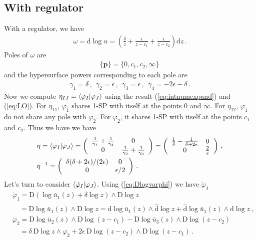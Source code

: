 \documentclass[a4paper,11pt]{article}
\newcommand{\nn}{\nonumber}
\newcommand{\nd}{\mathrm{d}}
\newcommand{\nD}{\mathrm{D}}
\newcommand{\nds}{\hat{\mathrm{d}}}
\newcommand{\ep}{\epsilon}
\def\eref#1{(\ref{#1})}
\begin{document}
\subsection{With regulator}
With a regulator, we have
\begin{align}
\omega=\nd \log u = \left( \frac{\delta}{z} + \frac{\ep}{z-c_1}+ \frac{\ep}{z-c_2} \right) \nd z \, .
\end{align}
Poles of $\omega$ are
\begin{align}
\{\bm{p}\}=\{0,c_1,c_2,\infty\} \, 
\end{align}
and the hypersurface powers corresponding to each pole are
\begin{align}
\gamma_1=\delta\, , \ \ \gamma_2=\ep\, , \ \ \gamma_3=\ep\, , \ \ \gamma_4=-2\ep-\delta \, .
\end{align}
Now we compute $\eta_{IJ}=\braket{\varphi_I|\varphi_J}$ using the result \eref{eq:intnumexpand} and \eref{eq:LO}. 
For $\eta_{11}$,  $\varphi_1$ shares 1-SP with itself at the points $0$ and $\infty$. For $\eta_{12}$,
$\varphi_1$ do not share any pole with $\varphi_2$. For  $\varphi_2$, it  shares 1-SP with itself at the points $c_1$ and $c_2$.  Thus we have  we have 
\begin{align}
&\eta=\braket{\varphi_I|\varphi_J}=\left(
\begin{array}{cc}
 \frac{1}{\gamma_1}+\frac{1}{\gamma_4} & 0 \\
 0 &  \frac{1}{\gamma_2}+\frac{1}{\gamma_3}  \\
\end{array}
\right)=\left(
\begin{array}{cc}
 \frac{1}{\delta }-\frac{1}{\delta +2 \epsilon } & 0 \\
 0 & \frac{2}{\epsilon } \\
\end{array}
\right)  \, , \nn\\
&\eta^{-1}=\left(
\begin{array}{cc}
 \delta(\delta+2\ep)/(2 \epsilon)  & 0 \\
 0 & \epsilon/2 \\
\end{array}
\right)  \, .
\end{align}
Let's turn to consider $\braket{\dot{\varphi}_I|\varphi_J}$. Using \eref{eq:Dlogvarphi} we have $\dot{\varphi}_I$
\begin{align}
&\dot{\varphi}_1 = \nD \left(\log \bar{u}_1(z) + \delta \log z \right) \wedge \nD \log z \nn\\
& \quad = \nD \log \bar{u}_1(z) \wedge \nD \log z= \nd \log \bar{u}_1(z) \wedge \nds \log z+\nds \log \bar{u}_1(z) \wedge \nd \log z \, , \nn\\
&\dot{\varphi}_2 =  \nD \log \bar{u}_2(z) \wedge \nD \log (z-c_1) - \nD \log \bar{u}_3(z) \wedge \nD \log (z-c_2)   \nn\\
&\quad = \delta ~ \nD \log z \wedge \varphi_2 + 2 \ep ~ \nD \log (z-c_2) \wedge \nD \log (z-c_1)  \, . ~~~\label{4.7}\end{align}
\end{document}
